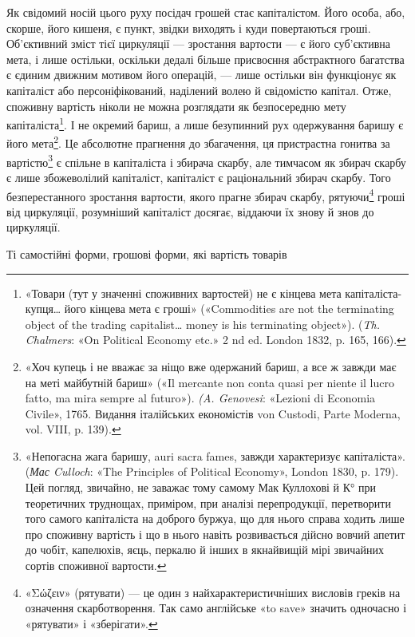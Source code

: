 Як свідомий носій цього руху посідач грошей стає капіталістом.
Його особа, або, скорше, його кишеня, є пункт, звідки виходять
і куди повертаються гроші. Об’єктивний зміст тієї циркуляції
— зростання вартости — є його суб’єктивна мета, і лише
остільки, оскільки дедалі більше присвоєння абстрактного багатства
є єдиним движним мотивом його операцій, — лише остільки
він функціонує як капіталіст або персоніфікований, наділений
волею й свідомістю капітал. Отже, споживну вартість ніколи не
можна розглядати як безпосередню мету капіталіста\footnote{
«Товари (тут у значенні споживних вартостей) не є кінцева мета
капіталіста-купця\dots{} його кінцева мета є гроші» («Commodities are
not the terminating object of the trading capitalist\dots{} money is his terminating
object»). (\emph{Th. Chalmers}: «On Political Economy etc.» 2 nd ed. London
1832, p. 165, 166).
}. І не окремий
бариш, а лише безупинний рух одержування баришу є його
мета\footnote{
«Хоч купець і не вважає за ніщо вже одержаний бариш, а все ж
завжди має на меті майбутній бариш» («Il mercante non conta quasi per
niente il lucro fatto, ma mira sempre al futuro»). \emph{(A. Genovesi}: «Lezioni
di Economia Civile», 1765. Видання італійських економістів von Custodi,
Parte Moderna, vol. VIII, p. 139).
}. Це абсолютне прагнення до збагачення, ця пристрастна
гонитва за вартістю\footnote{
«Непогасна жага баришу, auri sacra fames, завжди характеризує
капіталіста». (\emph{Мас Culloch}: «The Principles of Political Economy»,
London 1830, p. 179). Цей погляд, звичайно, не заважає тому самому
Мак Куллохові й К° при теоретичних труднощах, приміром, при аналізі
перепродукції, перетворити того самого капіталіста на доброго буржуа,
що для нього справа ходить лише про споживну вартість і що в нього
навіть розвивається дійсно вовчий апетит до чобіт, капелюхів, яєць,
перкалю й інших в якнайвищій мірі звичайних сортів споживної вартости.
} є спільне в капіталіста і збирача скарбу,
але тимчасом як збирач скарбу є лише збожеволілий капіталіст,
капіталіст є раціональний збирач скарбу. Того безперестанного
зростання вартости, якого прагне збирач скарбу, рятуючи\footnote{
«\textgreek{Σώζειν}» (рятувати) — це один з найхарактеристичніших висловів
греків на означення скарботворення. Так само англійське «to save» значить
одночасно і «рятувати» і «зберігати».
} гроші від циркуляції, розумніший капіталіст досягає, віддаючи їх знову
й знов до циркуляції.

Ті самостійні форми, грошові форми, які вартість товарів
\parbreak{}  %
